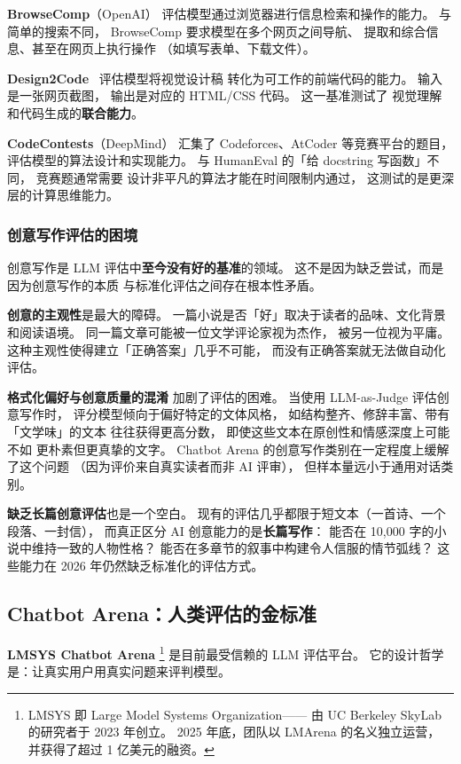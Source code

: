 \textbf{BrowseComp}（OpenAI）
评估模型通过浏览器进行信息检索和操作的能力。
与简单的搜索不同，
BrowseComp 要求模型在多个网页之间导航、
提取和综合信息、甚至在网页上执行操作
（如填写表单、下载文件）。

\textbf{Design2Code}~\cite{si2024design2code}
评估模型将视觉设计稿
转化为可工作的前端代码的能力。
输入是一张网页截图，
输出是对应的 HTML/CSS 代码。
这一基准测试了
视觉理解和代码生成的\textbf{联合能力}。

\textbf{CodeContests}（DeepMind）
汇集了 Codeforces、AtCoder 等竞赛平台的题目，
评估模型的算法设计和实现能力。
与 HumanEval 的「给 docstring 写函数」不同，
竞赛题通常需要
设计非平凡的算法才能在时间限制内通过，
这测试的是更深层的计算思维能力。

\subsubsection{创意写作评估的困境}

创意写作是 LLM 评估中\textbf{至今没有好的基准}的领域。
这不是因为缺乏尝试，而是因为创意写作的本质
与标准化评估之间存在根本性矛盾。

\textbf{创意的主观性}是最大的障碍。
一篇小说是否「好」取决于读者的品味、文化背景和阅读语境。
同一篇文章可能被一位文学评论家视为杰作，
被另一位视为平庸。
这种主观性使得建立「正确答案」几乎不可能，
而没有正确答案就无法做自动化评估。

\textbf{格式化偏好与创意质量的混淆}
加剧了评估的困难。
当使用 LLM-as-Judge 评估创意写作时，
评分模型倾向于偏好特定的文体风格，
如结构整齐、修辞丰富、带有「文学味」的文本
往往获得更高分数，
即使这些文本在原创性和情感深度上可能不如
更朴素但更真挚的文字。
Chatbot Arena 的创意写作类别在一定程度上缓解了这个问题
（因为评价来自真实读者而非 AI 评审），
但样本量远小于通用对话类别。

\textbf{缺乏长篇创意评估}也是一个空白。
现有的评估几乎都限于短文本（一首诗、一个段落、一封信），
而真正区分 AI 创意能力的是\textbf{长篇写作}：
能否在 10,000 字的小说中维持一致的人物性格？
能否在多章节的叙事中构建令人信服的情节弧线？
这些能力在 2026 年仍然缺乏标准化的评估方式。

\subsection{Chatbot Arena：人类评估的金标准}
\label{subsec:chatbot-arena}

\textbf{LMSYS Chatbot Arena}%
\footnote{LMSYS 即 Large Model Systems Organization——
由 UC Berkeley SkyLab 的研究者于 2023 年创立。
2025 年底，团队以 LMArena 的名义独立运营，
并获得了超过 1 亿美元的融资。}
是目前最受信赖的 LLM 评估平台。
它的设计哲学是：让真实用户用真实问题来评判模型。

